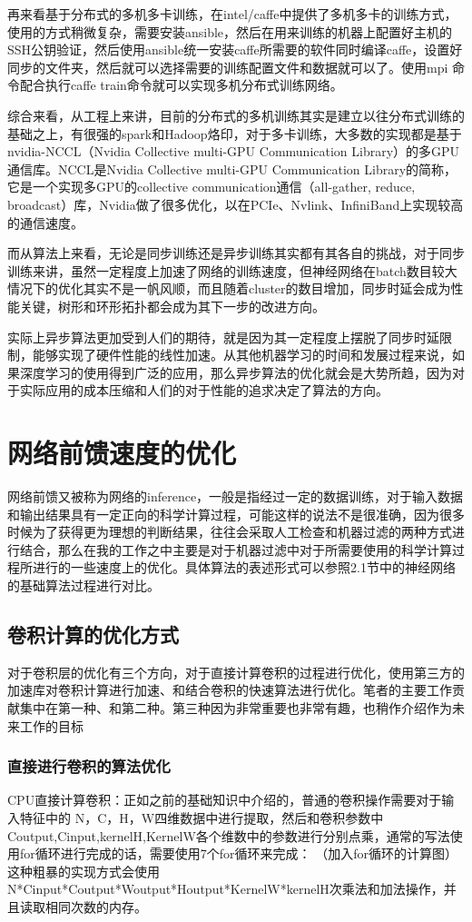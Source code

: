 再来看基于分布式的多机多卡训练，在intel/caffe中提供了多机多卡的训练方式，使用的方式稍微复杂，需要安装ansible，然后在用来训练的机器上配置好主机的SSH公钥验证，然后使用ansible统一安装caffe所需要的软件同时编译caffe，设置好同步的文件夹，然后就可以选择需要的训练配置文件和数据就可以了。使用mpi 命令配合执行caffe train命令就可以实现多机分布式训练网络。

综合来看，从工程上来讲，目前的分布式的多机训练其实是建立以往分布式训练的基础之上，有很强的spark和Hadoop烙印，对于多卡训练，大多数的实现都是基于nvidia-NCCL（Nvidia Collective multi-GPU Communication Library）的多GPU通信库。NCCL是Nvidia Collective multi-GPU Communication Library的简称，它是一个实现多GPU的collective communication通信（all-gather, reduce, broadcast）库，Nvidia做了很多优化，以在PCIe、Nvlink、InfiniBand上实现较高的通信速度。

而从算法上来看，无论是同步训练还是异步训练其实都有其各自的挑战，对于同步训练来讲，虽然一定程度上加速了网络的训练速度，但神经网络在batch数目较大情况下的优化其实不是一帆风顺，而且随着cluster的数目增加，同步时延会成为性能关键，树形和环形拓扑都会成为其下一步的改进方向。

实际上异步算法更加受到人们的期待，就是因为其一定程度上摆脱了同步时延限制，能够实现了硬件性能的线性加速。从其他机器学习的时间和发展过程来说，如果深度学习的使用得到广泛的应用，那么异步算法的优化就会是大势所趋，因为对于实际应用的成本压缩和人们的对于性能的追求决定了算法的方向。
\section{网络前馈速度的优化}
网络前馈又被称为网络的inference，一般是指经过一定的数据训练，对于输入数据和输出结果具有一定正向的科学计算过程，可能这样的说法不是很准确，因为很多时候为了获得更为理想的判断结果，往往会采取人工检查和机器过滤的两种方式进行结合，那么在我的工作之中主要是对于机器过滤中对于所需要使用的科学计算过程所进行的一些速度上的优化。具体算法的表述形式可以参照2.1节中的神经网络的基础算法过程进行对比。
\subsection{卷积计算的优化方式}
对于卷积层的优化有三个方向，对于直接计算卷积的过程进行优化，使用第三方的加速库对卷积计算进行加速、和结合卷积的快速算法进行优化。笔者的主要工作贡献集中在第一种、和第二种。第三种因为非常重要也非常有趣，也稍作介绍作为未来工作的目标
\subsubsection{直接进行卷积的算法优化}
CPU直接计算卷积：正如之前的基础知识中介绍的，普通的卷积操作需要对于输入特征中的 N，C，H，W四维数据中进行提取，然后和卷积参数中Coutput,Cinput,kernelH,KernelW各个维数中的参数进行分别点乘，通常的写法使用for循环进行完成的话，需要使用7个for循环来完成：
（加入for循环的计算图）
这种粗暴的实现方式会使用N*Cinput*Coutput*Woutput*Houtput*KernelW*kernelH次乘法和加法操作，并且读取相同次数的内存。

